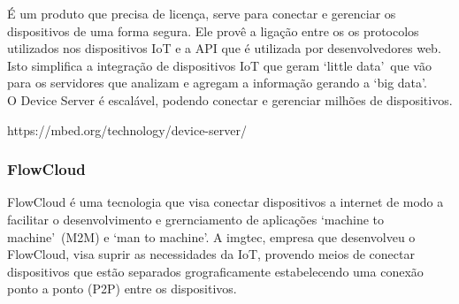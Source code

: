 É um produto que precisa de licença, serve para conectar e gerenciar os dispositivos de uma forma segura. Ele provê a ligação entre os os protocolos utilizados nos dispositivos IoT e a API que é utilizada por desenvolvedores web. Isto simplifica a integração de dispositivos IoT que geram \lq little data\rq\ que vão para os servidores que analizam e agregam a informação gerando a \lq big data\rq.\\
O Device Server é escalável, podendo conectar e gerenciar milhões de dispositivos.

https://mbed.org/technology/device-server/ \\

\subsubsection{FlowCloud}
FlowCloud \cite{flowcloud} é uma tecnologia que visa conectar dispositivos a internet de modo a facilitar o desenvolvimento e grernciamento de aplicações \lq machine to machine\rq\ (M2M) e \lq man to machine\rq. A imgtec, empresa que desenvolveu o FlowCloud, visa suprir as necessidades da IoT, provendo meios de conectar dispositivos que estão separados grograficamente estabelecendo uma conexão ponto a ponto (P2P) entre os dispositivos.

